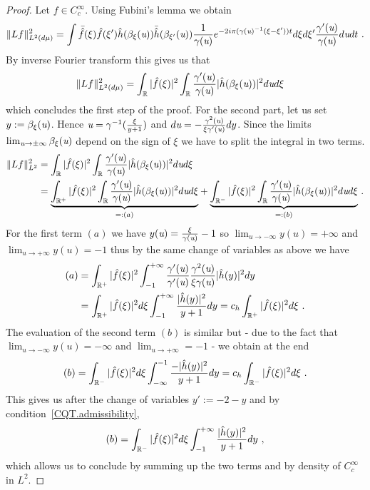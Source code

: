 \begin{proof}
	Let $f\in C_c^\infty$. Using Fubini's lemma we obtain 
	\begin{equation*}
		\|Lf\|_{L^2(d\mu)}^2 = \int\bar{\hat{f}}(\xi)\hat{f}(\xi')\hat{h}(\beta_\xi(\textit{u}))\bar{\hat{h}}(\beta_{\xi'}(\textit{u}))\frac{1}{\gamma(\textit{u})}e^{-2i\pi(\gamma(\textit{u})^{-1}(\xi-\xi'))t} d\xi d\xi' \frac{\gamma'(\textit{u})}{\gamma(\textit{u})}d\textit{u} dt\ .
	\end{equation*}
	By inverse Fourier transform this gives us that
	\begin{align*}
		\|L f\|_{L^2(d\mu)}^2 &= \int_{\mathbb{R}}|\hat{f}(\xi)|^2\int_{\mathbb{R}} \frac{\gamma'(\textit{u})}{\gamma(\textit{u})}|\hat{h}(\beta_\xi(\textit{u}))|^2d\textit{u} d\xi
	\end{align*}
     which concludes the first step of the proof.
	For the second part, let us set $y:=\beta_\xi(\textit{u})$. Hence $\textit{u}=\gamma^{-1}(\frac{\xi}{y+1})$ and $d\textit{u} =-\frac{\gamma^2(\textit{u})}{\xi\gamma'(\textit{u})}dy$. Since the limits $\lim_{\textit{u}\to\pm\infty}\beta_\xi(\textit{u})$ depend on the sign of $\xi$ we have to split the integral in two terms.
	\begin{align*}
		\|L f\|_{L^2}^2 &= \int_{\mathbb{R}}|\hat{f}(\xi)|^2\int_{\mathbb{R}}\frac{\gamma'(\textit{u})}{\gamma(\textit{u})}|\hat{h}(\beta_\xi(\textit{u}))|^2d\textit{u} d\xi \\
		& = \underset{=:(a)}{\underbrace{\int_{\mathbb{R}^+}|\hat{f}(\xi)|^2\int_{\mathbb{R}}\frac{\gamma'(\textit{u})}{\gamma(\textit{u})}|\hat{h}(\beta_\xi(\textit{u}))|^2d\textit{u} d\xi}} + \underset{=:(b)}{\underbrace{\int_{\mathbb{R}^-}|\hat{f}(\xi)|^2\int_{\mathbb{R}}\frac{\gamma'(\textit{u})}{\gamma(\textit{u})}|\hat{h}(\beta_\xi(\textit{u}))|^2d\textit{u} d\xi}}\ .
	\end{align*}
	For the first term $(a)$ we have $y(\textit{u})=\frac{\xi}{\gamma(\textit{u})}-1$ so $\lim_{u\to -\infty}y(u)=+\infty$ and $\lim_{u\to +\infty}y(u)=-1$ thus by the same change of variables as above we have
	\begin{align*}
		(a) &= \int_{\mathbb{R}^+}|\hat{f}(\xi)|^2\int_{-1}^{+\infty}\frac{\gamma'(\textit{u})}{\gamma'(\textit{u})}\frac{\gamma^2(\textit{u})}{\xi\gamma(\textit{u})}|\hat{h}(y)|^2dy \\
		&= \int_{\mathbb{R}^+} |\hat{f}(\xi)|^2 d\xi\int_{-1}^{+\infty}\frac{|\hat{h}(y)|^2}{y+1}dy = c_h \int_{\mathbb{R}^+} |\hat{f}(\xi)|^2 d\xi\ .
	\end{align*}
	The evaluation of the second term $(b)$ is similar but - due to the fact that $\lim_{u\to -\infty} y(u)=-\infty$ and $\lim_{u\to +\infty}=-1$ - we obtain at the end
	\begin{equation*}
		(b) = \int_{\mathbb{R}^-} |\hat{f}(\xi)|^2 d\xi\int_{-\infty}^{-1}\frac{-|\hat{h}(y)|^2}{y+1}dy = c_h \int_{\mathbb{R}^-} |\hat{f}(\xi)|^2 d\xi\ .
	\end{equation*}
	This gives us after the change of variables $y':=-2-y$ and by condition~\eqref{CQT.admissibility},
	\begin{equation*}
		(b) = \int_{\mathbb{R}^-} |\hat{f}(\xi)|^2 d\xi\int_{-1}^{+\infty}\frac{|\hat{h}(y)|^2}{y+1}dy\ ,
	\end{equation*}
	which allows us to conclude by summing up the two terms and by density of $C_c^\infty$ in $L^2$.
\end{proof}
